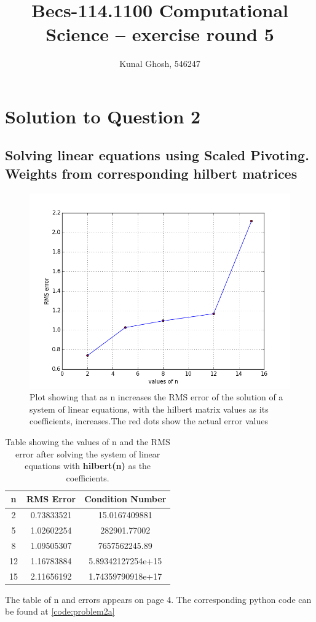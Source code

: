 \documentclass[a4paper,11pt]{article}
\begin{document}
\title{Becs-114.1100 Computational Science -- exercise round 5} %
\author{Kunal Ghosh, 546247} %
\maketitle
\section{Solution to Question 2}
\subsection{Solving linear equations using Scaled Pivoting. Weights from corresponding hilbert matrices}\label{prob2a}
\begin{figure}[ht]
	\center
	\includegraphics[scale=0.75]{figure_1.png}
    \caption{Plot showing that as n increases the RMS error of the solution of a system of linear equations, with the hilbert matrix values as its coefficients, increases.The red dots show the actual error values}
	\label{fig:err1}
\end{figure}

\begin{table}[ht]
\centering
\label{my-label}
\begin{tabular}{|c|c|c|}
\hline
 \textbf{n}&\textbf{RMS Error}&\textbf{Condition Number}  \\ \hline
 2&0.73833521&15.0167409881  \\ \hline
 5&1.02602254&282901.77002 \\ \hline
 8&1.09505307&7657562245.89 \\ \hline
 12&1.16783884&5.89342127254e+15 \\ \hline
 15&2.11656192&1.74359790918e+17 \\ \hline
\end{tabular}
\caption{Table showing the values of n and the RMS error after solving the system of linear equations with \textbf{hilbert(n)} as the coefficients.}
\end{table}
The table of n and errors appears on page 4.
The corresponding python code can be found at \ref{code:problem2a}
\end{document}
